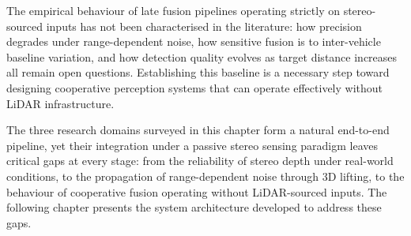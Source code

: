The empirical behaviour of late fusion pipelines operating strictly on
stereo-sourced inputs has not been characterised in the literature: how precision
degrades under range-dependent noise, how sensitive fusion is to inter-vehicle
baseline variation, and how detection quality evolves as target distance increases
all remain open questions. Establishing this baseline is a necessary step toward
designing cooperative perception systems that can operate effectively without
LiDAR infrastructure.

\bigskip
\noindent The three research domains surveyed in this chapter form a natural
end-to-end pipeline, yet their integration under a passive stereo sensing paradigm
leaves critical gaps at every stage: from the reliability of stereo depth under
real-world conditions, to the propagation of range-dependent noise through 3D
lifting, to the behaviour of cooperative fusion operating without LiDAR-sourced
inputs. The following chapter presents the system architecture developed to
address these gaps.
